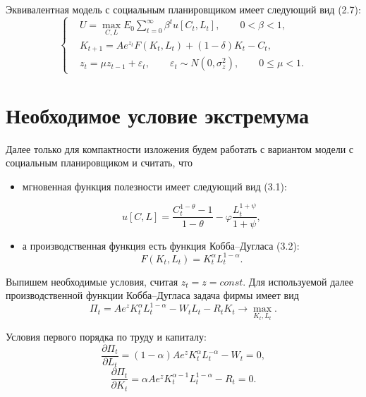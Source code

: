 Эквивалентная модель с социальным планировщиком имеет следующий вид (2.7):
\begin{equation}
\left\{
\begin{aligned}
    &U = \max_{C,L} E_0 \sum_{t=0}^{\infty} \beta^t u[C_t,L_t],
    \qquad 0 < \beta < 1, \\[0.5em]
    &K_{t+1} = A e^{z_t} F(K_t,L_t) + (1-\delta)K_t - C_t, \\[0.5em]
    &z_t = \mu z_{t-1} + \varepsilon_t,
    \qquad
    \varepsilon_t \sim N(0,\sigma_z^2),
    \qquad
    0 \leq \mu < 1.
\end{aligned}
\right.
\end{equation}

\section{Необходимое условие экстремума}
Далее только для компактности изложения будем работать с вариантом модели с
социальным планировщиком и считать, что

\begin{itemize}
    \item мгновенная функция полезности имеет следующий вид (3.1):

    \begin{equation}
        u[C,L]
        =
        \frac{C_t^{1-\theta} - 1}{1-\theta}
        -
        \varphi \frac{L_t^{1+\psi}}{1+\psi},
    \end{equation}



    \item а производственная функция есть функция Кобба--Дугласа (3.2):
    \begin{equation}
        F(K_t,L_t) = K_t^{\alpha} L_t^{1-\alpha}.
    \end{equation}
\end{itemize}

Выпишем необходимые условия, считая $z_t = z = const$. Для используемой далее
производственной функции Кобба--Дугласа задача фирмы имеет вид
\[
    \Pi_t
    =
    A e^z K_t^\alpha L_t^{1-\alpha}
    -
    W_t L_t
    -
    R_t K_t
    \rightarrow \max_{K_t,L_t}.
\]

Условия первого порядка по труду и капиталу:
\[
    \frac{\partial \Pi_t}{\partial L_t}
    =
    (1-\alpha)A e^z K_t^\alpha L_t^{-\alpha}
    -
    W_t
    =
    0,
\]
\[
    \frac{\partial \Pi_t}{\partial K_t}
    =
    \alpha A e^z K_t^{\alpha-1}L_t^{1-\alpha}
    -
    R_t
    =
    0.
\]

